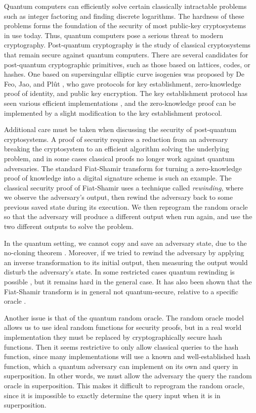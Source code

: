 \documentclass[runningheads,a4paper]{llncs}
\begin{document}
Quantum computers can efficiently solve certain classically intractable problems such as integer factoring and finding discrete logarithms. The hardness of these problems forms the foundation of the security of most public-key cryptosystems in use today. Thus, quantum computers pose a serious threat to modern cryptography. Post-quantum cryptography is the study of classical cryptosystems that remain secure against quantum computers.  There are several candidates for post-quantum cryptographic primitives, such as those based on lattices, codes, or hashes. One based on supersingular elliptic curve isogenies was proposed by De Feo, Jao, and Pl\^ut \cite{FJP14}, who gave protocols for key establishment, zero-knowledge proof of identity, and public key encryption. The key establishment protocol has seen various efficient implementations \cite{Costello16,AKJKJ16}, and the zero-knowledge proof can be implemented by a slight modification to the key establishment protocol.

Additional care must be taken when discussing the security of post-quantum cryptosystems. A proof of security requires a reduction from an adversary breaking the cryptosystem to an efficient algorithm solving the underlying problem, and in some cases classical proofs no longer work against quantum adversaries. The standard Fiat-Shamir transform \cite{FS87} for turning a zero-knowledge proof of knowledge into a digital signature scheme is such an example. The classical security proof of Fiat-Shamir uses a technique called \emph{rewinding}, where we observe the adversary's output, then rewind the adversary back to some previous saved state during its execution. We then reprogram the random oracle so that the adversary will produce a different output when run again, and use the two different outputs to solve the problem.

In the quantum setting, we cannot copy and save an adversary state, due to the no-cloning theorem \cite{WZ82}. Moreover, if we tried to rewind the adversary by applying an inverse transformation to its initial output, then measuring the output would disturb the adversary's state. In some restricted cases quantum rewinding is possible \cite{Watrous09,Unruh12}, but it remains hard in the general case. It has also been shown that the Fiat-Shamir transform is in general not quantum-secure, relative to a specific oracle \cite{ARU14}.

Another issue is that of the quantum random oracle. The random oracle model allows us to use ideal random functions for security proofs, but in a real world implementation they must be replaced by cryptographically secure hash functions. Then it seems restrictive to only allow classical queries to the hash function, since many implementations will use a known and well-established hash function, which a quantum adversary can implement on its own and query in superposition. In other words, we must allow the adversary the query the random oracle in superposition. This makes it difficult to reprogram the random oracle, since it is impossible to exactly determine the query input when it is in superposition.
\end{document}
